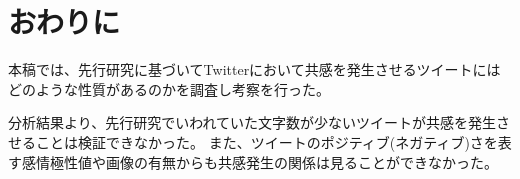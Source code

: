 \documentclass[dvipdfmx]{issj}
\begin{document}












\section{おわりに}  %

本稿では、先行研究に基づいてTwitterにおいて共感を発生させるツイートにはどのような性質があるのかを調査し考察を行った。

分析結果より、先行研究でいわれていた文字数が少ないツイートが共感を発生させることは検証できなかった。
また、ツイートのポジティブ(ネガティブ)さを表す感情極性値や画像の有無からも共感発生の関係は見ることができなかった。
\end{document}
